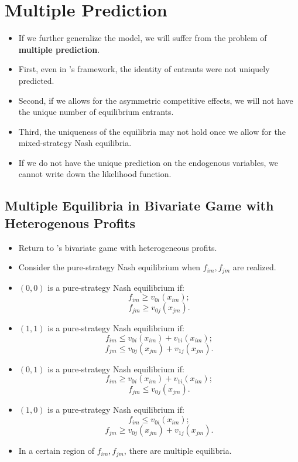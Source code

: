 \documentclass[]{book}
\providecommand{\tightlist}{%
  \setlength{\itemsep}{0pt}\setlength{\parskip}{0pt}}
\begin{document}
\section{Multiple Prediction}\label{multiple-prediction}

\begin{itemize}
\tightlist
\item
  If we further generalize the model, we will suffer from the problem of
  \textbf{multiple prediction}.
\item
  First, even in \citet{berry_estimation_1992}'s framework, the identity
  of entrants were not uniquely predicted.
\item
  Second, if we allows for the asymmetric competitive effects, we will
  not have the unique number of equilibrium entrants.
\item
  Third, the uniqueness of the equilibria may not hold once we allow for
  the mixed-strategy Nash equilibria.
\item
  If we do not have the unique prediction on the endogenous variables,
  we cannot write down the likelihood function.
\end{itemize}

\subsection{Multiple Equilibria in Bivariate Game with Heterogenous
Profits}\label{multiple-equilibria-in-bivariate-game-with-heterogenous-profits}

\begin{itemize}
\tightlist
\item
  Return to \citet{tamer_incomplete_2003}'s bivariate game with
  heterogeneous profits.
\item
  Consider the pure-strategy Nash equilibrium when \(f_{im}, f_{jm}\)
  are realized.
\item
  \((0, 0)\) is a pure-strategy Nash equilibrium if: \[
  f_{im} \ge v_{0i}(x_{im});
  \] \[
  f_{jm} \ge v_{0j}(x_{jm}).
  \]
\item
  \((1, 1)\) is a pure-strategy Nash equilibrium if: \[
  f_{im} \le v_{0i}(x_{im}) + v_{1i}(x_{im});
  \] \[
  f_{jm} \le v_{0j}(x_{jm}) + v_{1j}(x_{jm}).
  \]
\item
  \((0, 1)\) is a pure-strategy Nash equilibrium if: \[
  f_{im} \ge v_{0i}(x_{im}) + v_{1i}(x_{im});
  \] \[
  f_{jm} \le v_{0j}(x_{jm}).
  \]
\item
  \((1, 0)\) is a pure-strategy Nash equilibrium if: \[
  f_{im} \le v_{0i}(x_{im});
  \] \[
  f_{jm} \ge v_{0j}(x_{jm}) + v_{1j}(x_{jm}).
  \]
\item
  In a certain region of \(f_{im}, f_{jm}\), there are multiple
  equilibria.
\end{itemize}
\end{document}
